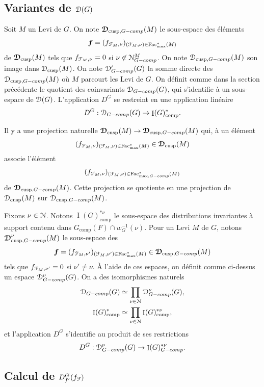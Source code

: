 \documentclass[11pt]{article}
\numberwithin{equation}{section}\providecommand{\og}{«\,}\providecommand{\fg}{\,»}
\let\mathcal \EuScript
\newcommand{\comp}{\mathrm{comp}}
\newcommand{\tcomp}{\textup{-comp}}
\newcommand{\cusp}{\mathrm{cusp}}
\newcommand{\Fac}{\mathrm{Fac}}
\DeclareMathOperator{\rI}{I}
\newcommand{\bmf}{\boldsymbol{f}}
\newcommand{\cD}{\mathcal{D}}
\newcommand{\cF}{\mathcal{F}}
\newcommand{\cN}{\mathcal{N}}
\theoremstyle{plain}
\theoremstyle{definition}
\begin{document}
\subsection{Variantes de \texorpdfstring{$\cD(G)$}{DG}}\label{variantes}
Soit $M$ un Levi de $G$. On note $\boldsymbol{\cD}_{\cusp,G\tcomp}(M)$ le sous-espace des éléments
\[
\bmf=(f_{\cF_{M},\nu})_{(\cF_{M},\nu)\in \Fac^*_{\max}(M)}
\]
de $ \boldsymbol{\cD}_{\cusp}(M)$ tels que $f_{\cF_{M},\nu}=0$ si $\nu\not\in \cN^M_{G\tcomp}$. On note $\cD_{\cusp,G\tcomp}(M)$ son image dans $\cD_{\cusp}(M)$. On note $\cD'_{G\tcomp}(G)$ la somme directe des $\cD_{\cusp,G\tcomp}(M)$ où $M$ parcourt les Levi de $G$. On définit comme dans la section précédente le quotient des coinvariants $\cD_{G\tcomp}(G)$, qui s'identifie à un sous-espace de $\cD(G)$. L'application $D^G$ se restreint en une application linéaire
\[
D^G:\cD_{G\tcomp}(G)\to \rI(G)^*_{\comp}.
\]

Il y a une projection naturelle $\boldsymbol{\cD}_{\cusp}(M)\to \boldsymbol{\cD}_{\cusp,G\tcomp}(M)$ qui, à un élément
\[
(f_{\cF_{M},\nu})_{(\cF_{M},\nu)\in \Fac^*_{\max}(M)}\in \boldsymbol{\cD}_{\cusp}(M)
\]
associe l'élément
\[
(f_{\cF_{M},\nu})_{(\cF_{M},\nu)\in \Fac^*_{\max,G\tcomp}(M)}
\]
de $ \boldsymbol{\cD}_{\cusp,G\tcomp}(M)$. Cette projection se quotiente en une projection de $\cD_{\cusp}(M)$ sur $\cD_{\cusp,G\tcomp}(M)$.

Fixons $\nu\in \cN$. Notons $\rI(G)^{*\nu}_{\comp}$ le sous-espace des distributions invariantes à support contenu dans $G_{\comp}(F)\cap w_{G}^{-1}(\nu)$. Pour un Levi $M$ de $G$, notons $\boldsymbol{\cD}^{\nu}_{\cusp,G\tcomp}(M)$ le sous-espace des
\[
\bmf=(f_{\cF_{M},\nu'})_{(\cF_{M},\nu')\in \Fac^*_{\max}(M)}\in \boldsymbol{\cD}_{\cusp,G\tcomp}(M)
\]
tels que $f_{\cF_{M},\nu'}=0$ si $\nu'\neq\nu$. À l'aide de ces espaces, on définit comme ci-dessus un espace $\cD^{\nu}_{G\tcomp}(G)$. On a des isomorphismes naturels
\begin{align*}
\cD_{G\tcomp}(G)&\simeq \prod_{\nu\in \cN}\cD_{G\tcomp}^{\nu}(G),
\\
\rI(G)^*_{\comp}&\simeq \prod_{\nu\in \cN}\rI(G)^{*\nu}_{\comp},
\end{align*}
et l'application $D^G$ s'identifie au produit de ses restrictions
\[
D^G:\cD_{G\tcomp}^{\nu}(G)\to \rI(G)^{*\nu}_{G\tcomp}.
\]

\subsection{Calcul de \texorpdfstring{$D_{f'}^G(f_{\cF})$}{DGf}}\label{calcul}
\end{document}
